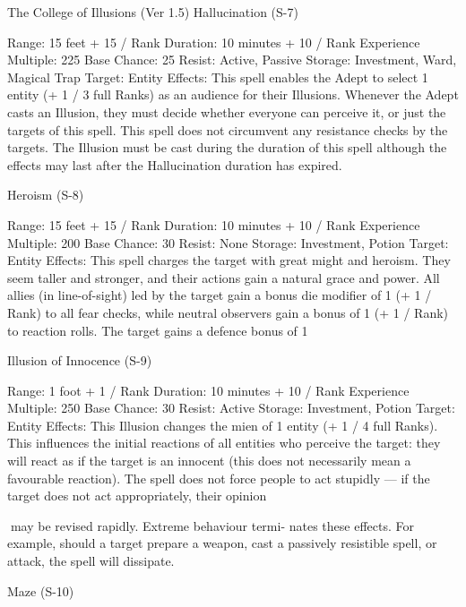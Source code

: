 \begin{Chapter}{The College of Illusions (Ver 1.5)}
Hallucination (S-7) 

Range: 15 feet + 15 / Rank 
Duration: 10 minutes + 10 / Rank 
Experience Multiple: 225 
Base Chance: 25%
Resist: Active, Passive 
Storage: Investment, Ward, Magical Trap 
Target: Entity 
Effects:  This  spell  enables  the  Adept  to  select  1 
entity (+ 1 / 3 full Ranks) as an audience for their 
Illusions.  Whenever  the  Adept  casts  an  Illusion, 
they must decide whether everyone can perceive it, 
or just the targets of this spell. This spell does not 
circumvent  any  resistance  checks  by  the  targets. 
The  Illusion  must  be  cast  during  the  duration  of 
this  spell  although  the  effects  may  last  after  the 
Hallucination duration has expired. 

Heroism (S-8) 

Range: 15 feet + 15 / Rank 
Duration: 10 minutes + 10 / Rank 
Experience Multiple: 200 
Base Chance: 30%
Resist: None 
Storage: Investment, Potion 
Target: Entity 
Effects:  This  spell  charges  the  target  with  great 
might and heroism. They seem taller and stronger, 
and  their  actions  gain  a  natural  grace  and  power. 
All allies  (in line-of-sight) led by the target gain a 
bonus  die  modifier  of  1  (+  1  /  Rank)  to  all  fear 
checks,  while  neutral  observers  gain  a  bonus  of  1 
(+  1  /  Rank)  to  reaction  rolls.  The  target  gains  a 
defence bonus of 1%

Illusion of Innocence (S-9) 

Range: 1 foot + 1 / Rank 
Duration: 10 minutes + 10 / Rank 
Experience Multiple: 250 
Base Chance: 30%
Resist: Active 
Storage: Investment, Potion 
Target: Entity 
Effects:  This  Illusion  changes  the  mien  of  1  entity 
(+  1  /  4  full  Ranks).  This  influences  the  initial 
reactions  of  all  entities  who  perceive  the  target: 
they  will  react  as  if  the  target  is  an  innocent  (this 
does  not  necessarily  mean  a  favourable  reaction). 
The spell does not force people to act stupidly — if 
the  target  does  not  act appropriately,  their  opinion 

may  be  revised  rapidly.  Extreme  behaviour  termi-
nates  these  effects.  For  example,  should  a  target 
prepare  a  weapon,  cast  a passively  resistible  spell, 
or attack, the spell will dissipate. 

Maze (S-10) 


\end{Chapter}
